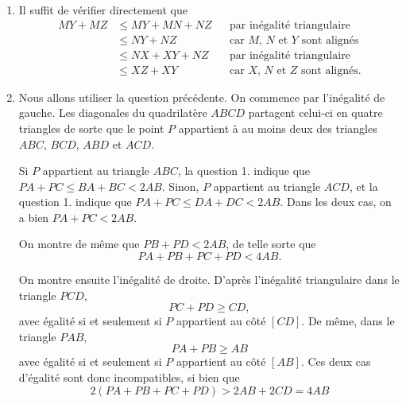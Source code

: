 \begin{enumerate}
\item
Il suffit de vérifier directement que
\begin{align*}
MY + MZ
& \le MY + MN + NZ && \text{par inégalité triangulaire} \\
& \le NY + NZ && \text{car $M$, $N$ et $Y$ sont alignés} \\
& \le NX + XY + NZ && \text{par inégalité triangulaire} \\
& \le XZ + XY && \text{car $X$, $N$ et $Z$ sont alignés.}
\end{align*}

\item
Nous allons utiliser la question précédente. On commence par l'inégalité de gauche. Les diagonales du quadrilatère $ABCD$ partagent celui-ci en quatre triangles de sorte que le point $P$ appartient à au moins deux des triangles $ABC$, $BCD$, $ABD$ et $ACD$.

Si $P$ appartient au triangle $ABC$, la question 1.
indique que $PA + PC \le BA + BC < 2 AB$.
Sinon, $P$ appartient au triangle $ACD$, et la question
1. indique que $PA + PC \le DA + DC < 2AB$.
Dans les deux cas, on a bien $PA + PC < 2AB$.

On montre de même que $PB + PD < 2AB$, de telle sorte que
$$PA+PB+PC+PD < 4AB.$$

On montre ensuite l'inégalité de droite. D'après l'inégalité triangulaire dans le triangle $PCD$,
$$PC +PD \ge CD,$$
avec égalité si et seulement si $P$ appartient au côté
$[CD]$.
De même, dans le triangle $PAB$,
$$PA+PB \ge AB$$
avec égalité si et seulement si $P$ appartient au côté $[AB]$.
Ces deux cas d'égalité sont donc incompatibles, si bien que
$$2(PA+PB+PC+PD) > 2AB+2CD = 4AB$$

\end{enumerate}


\altsol

